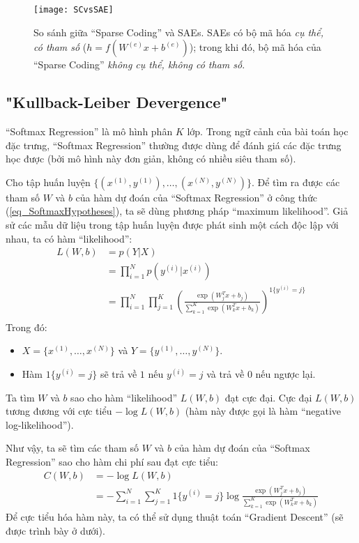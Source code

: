 \begin{figure}
	\centering
	\texttt{[image: SCvsSAE]}
	\caption[So sánh giữa ``Sparse Coding'' và SAEs]{So sánh giữa ``Sparse Coding'' và SAEs. SAEs có bộ mã hóa \emph{cụ thể, có tham số} ($h = f(W^{(e)}x + b^{(e)})$); trong khi đó, bộ mã hóa của ``Sparse Coding'' \emph{không cụ thể, không có tham số}.}
	\label{fig_SCvsSAE}
\end{figure}

\subsection{"Kullback-Leiber Devergence"}
``Softmax Regression'' là mô hình phân $K$ lớp. Trong ngữ cảnh của bài toán học đặc trưng, ``Softmax Regression'' thường được dùng để đánh giá các đặc trưng học được (bởi mô hình này đơn giản, không có nhiều siêu tham số).

Cho tập huấn luyện $\{(x^{(1)}, y^{(1)}), \ldots, (x^{(N)}, y^{(N)})\}$. Để tìm ra được các tham số $W$ và $b$ của hàm dự đoán của ``Softmax Regression'' ở công thức (\ref{eq_SoftmaxHypotheses}), ta sẽ dùng phương pháp ``maximum likelihood''. Giả sử các mẫu dữ liệu trong tập huấn luyện được phát sinh một cách độc lập với nhau, ta có hàm ``likelihood'':
\begin{equation}
\begin{split}
	L(W, b) &= p(Y|X)\\
			&= \prod_{i=1}^{N} p(y^{(i)}|x^{(i)})\\
			&= \prod_{i=1}^{N} \prod_{j=1}^K \left(\frac{\exp(W_j^Tx + b_j)}{\sum_{k=1}^{K}\exp(W_k^Tx + b_k)}\right)^{1\{y^{(i)}=j\}}\\
\end{split}
\end{equation}
Trong đó:
\begin{itemize}
	\item $X = \{x^{(1)}, \ldots, x^{(N)}\}$ và $Y = \{y^{(1)}, \ldots, y^{(N)}\}$.
	\item Hàm ${1\{y^{(i)}=j\}}$ sẽ trả về $1$ nếu $y^{(i)}=j$ và trả về $0$ nếu ngược lại.
\end{itemize}
Ta tìm $W$ và $b$ sao cho hàm ``likelihood'' $L(W, b)$ đạt cực đại. Cực đại $L(W, b)$ tương đương với cực tiểu $-\log L(W, b)$ (hàm này được gọi là hàm ``negative log-likelihood'').

Như vậy, ta sẽ tìm các tham số $W$ và $b$ của hàm dự đoán của ``Softmax Regression'' sao cho hàm chi phí sau đạt cực tiểu:
\begin{equation}
\begin{split}
	C(W, b) &= -\log L(W, b)\\
			&= -\sum_{i=1}^{N}\sum_{j=1}^{K} 1\{y^{(i)}=j\} \log \frac{\exp(W_j^Tx + b_j)}{\sum_{k=1}^{K}\exp(W_k^Tx + b_k)}
\end{split}
\end{equation}
Để cực tiểu hóa hàm này, ta có thể sử dụng thuật toán ``Gradient Descent'' (sẽ được trình bày ở dưới).



